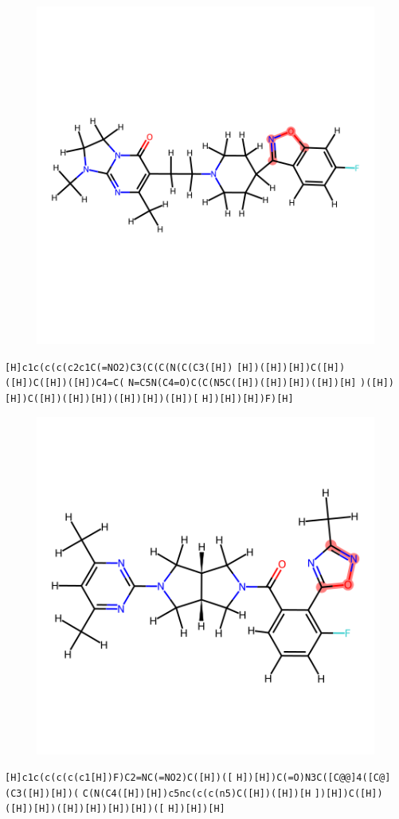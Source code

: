 \documentclass{article}
\begin{document}
\begin{figure}[ht]
\centering
    \includegraphics{mol214.png}
\end{figure}
\verb|[H]c1c(c(c(c2c1C(=NO2)C3(C(C(N(C(C3([H])| \verb|[H])([H])[H])C([H])([H])C([H])([H])C4=C(| \verb|N=C5N(C4=O)C(C(N5C([H])([H])[H])([H])[H]| \verb|)([H])[H])C([H])([H])[H])([H])[H])([H])[| \verb|H])[H])[H])F)[H]|

\begin{figure}[ht]
\centering
    \includegraphics{mol215.png}
\end{figure}
\verb|[H]c1c(c(c(c(c1[H])F)C2=NC(=NO2)C([H])([| \verb|H])[H])C(=O)N3C([C@@]4([C@](C3([H])[H])(| \verb|C(N(C4([H])[H])c5nc(c(c(n5)C([H])([H])[H| \verb|])[H])C([H])([H])[H])([H])[H])[H])[H])([| \verb|H])[H])[H]|
\end{document}
